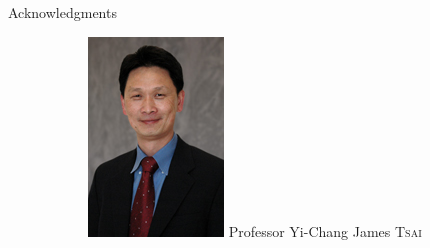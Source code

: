 \documentclass{beamer}
\begin{document}
\begin{frame}{Acknowledgments}
\begin{figure}
\begin{center}
\begin{subfigure}[t]{.3\linewidth}
          \includegraphics[height=1.2\linewidth]{figures/comettee/tsai_yichang_james.jpg}
          Professor Yi-Chang James \textsc{Tsai}
        \end{subfigure}
        \begin{subfigure}[t]{.3\linewidth}
          \centering

\end{subfigure}
\end{center}
\end{figure}
\end{frame}
\end{document}
